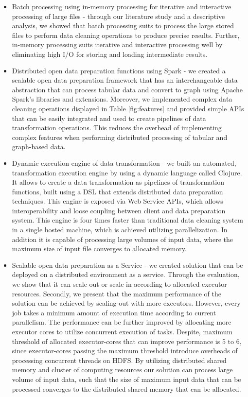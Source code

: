 \begin{itemize}
\item Batch processing using in-memory processing for iterative and interactive processing of large files - through our literature study and a descriptive analysis, we showed that batch processing suits to process the large stored files to perform data cleaning operations to produce precise results. Further, in-memory processing suits iterative and interactive processing well by eliminating high I/O for storing and loading intermediate results.
\item Distributed open data preparation functions using Spark - we created a scalable open data preparation framework that has an interchangeable data abstraction that can process tabular data and convert to graph using Apache Spark's libraries and extensions. Moreover, we implemented complex data cleaning operations displayed in Table \ref{fig:features} and provided simple APIs that can be easily integrated and used to create pipelines of data transformation operations. This reduces the overhead of implementing complex features when performing distributed processing of tabular and graph-based data. 
\item Dynamic execution engine of data transformation - we built an automated, transformation execution engine by using a dynamic language called Clojure. It allows to create a data transformation as pipelines of transformation functions, built using a DSL that extends distributed data preparation techniques. This engine is exposed via Web Service APIs, which allows interoperability and loose coupling between client and data preparation system. This engine is four times faster than traditional data cleaning system in a single hosted machine, which is achieved utilizing parallelization. In addition it is capable of processing large volumes of input data, where the maximum size of input file converges to allocated memory. 
\item Scalable open data preparation as a Service - we created solution that can be deployed on a distributed environment as a service. Through the evaluation, we show that it can scale-out or scale-in according to allocated  executor resources. Secondly, we present that the maximum performance of the solution can be achieved by scaling-out with more executors. However, every job takes a minimum amount of execution time according to current parallelism. The performance can be further improved by allocating more executor cores to utilize concurrent execution of tasks. Despite, maximum threshold of allocated executor-cores  that can improve performance is 5 to 6, since executor-cores passing the maximum threshold introduce overheads of processing concurrent threads on HDFS. By utilizing distributed shared memory and cluster of computing resources our solution can process large volume of input data, such that the size of maximum input data that can be processed converges to the distributed shared memory that can be allocated.

\end{itemize}
